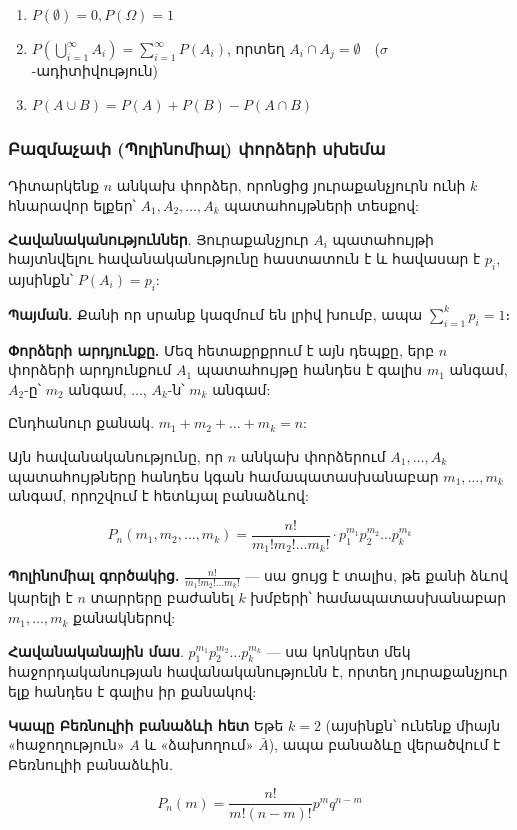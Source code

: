 \documentclass[12pt, a4paper]{article}
\begin{document}
\begin{enumerate}
    \item $P(\emptyset) = 0, P(\Omega) = 1$
    \item $P(\bigcup_{i=1}^{\infty} A_i) = \sum_{i=1}^{\infty} P(A_i)$, որտեղ $A_i \cap A_j = \emptyset \quad$($\sigma$-ադիտիվություն)
    \item $P(A \cup B) = P(A) + P(B) - P(A \cap B)$
\end{enumerate}

\subsubsection{\textbf{Բազմաչափ (Պոլինոմիալ) փորձերի սխեմա}}

Դիտարկենք $n$ անկախ փորձեր, որոնցից յուրաքանչյուրն ունի $k$ հնարավոր ելքեր՝ $A_1, A_2, \dots, A_k$ պատահույթների տեսքով:

\textbf{Հավանականություններ}. Յուրաքանչյուր $A_i$ պատահույթի հայտնվելու հավանականությունը հաստատուն է և հավասար է $p_i$, այսինքն՝ $P(A_i) = p_i$:

\textbf{Պայման.} Քանի որ սրանք կազմում են լրիվ խումբ, ապա $\sum_{i=1}^k p_i = 1$։

\textbf{Փորձերի արդյունքը.} Մեզ հետաքրքրում է այն դեպքը, երբ $n$ փորձերի արդյունքում $A_1$ պատահույթը հանդես է գալիս $m_1$ անգամ, $A_2$-ը՝ $m_2$ անգամ, ..., $A_k$-ն՝ $m_k$ անգամ:

Ընդհանուր քանակ. $m_1 + m_2 + \dots + m_k = n$:

Այն հավանականությունը, որ $n$ անկախ փորձերում $A_1, \dots, A_k$ պատահույթները հանդես կգան համապատասխանաբար $m_1, \dots, m_k$ անգամ, որոշվում է հետևյալ բանաձևով:

$$P_{n}(m_1, m_2, \dots, m_k) = \frac{n!}{m_1! m_2! \dots m_k!} \cdot p_1^{m_1} p_2^{m_2} \dots p_k^{m_k}$$

\textbf{Պոլինոմիալ գործակից.} $\frac{n!}{m_1! m_2! \dots m_k!}$ — սա ցույց է տալիս, թե քանի ձևով կարելի է $n$ տարրերը բաժանել $k$ խմբերի՝ համապատասխանաբար $m_1, \dots, m_k$ քանակներով:

\textbf{Հավանականային մաս}. $p_1^{m_1} p_2^{m_2} \dots p_k^{m_k}$ — սա կոնկրետ մեկ հաջորդականության հավանականությունն է, որտեղ յուրաքանչյուր ելք հանդես է գալիս իր քանակով:

\textbf{Կապը Բեռնուլիի բանաձևի հետ}
Եթե $k=2$ (այսինքն՝ ունենք միայն «հաջողություն» $A$ և «ձախողում» $\bar{A}$), ապա բանաձևը վերածվում է Բեռնուլիի բանաձևին.

$$P_n(m) = \frac{n!}{m!(n-m)!} p^m q^{n-m}$$
\end{document}
